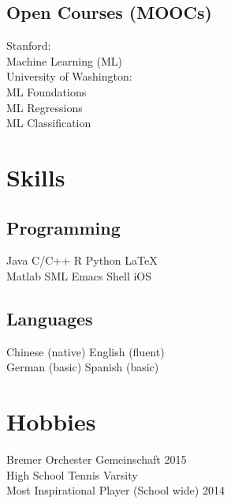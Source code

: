 \documentclass[]{deedy-resume-openfont}
\begin{document}
\begin{minipage}[t]{0.33\textwidth}
\sectionsep

\subsection{Open Courses (MOOCs)}
{\large Stanford}: \\
Machine Learning (ML) \\

\sectionsep
{\large University of Washington}:  \\
ML Foundations  \\
ML Regressions  \\
ML Classification

\sectionsep


\section{Skills}
\subsection{Programming}
Java \textbullet{}   C/C++ \textbullet{} R \textbullet{} Python \textbullet \LaTeX \\
Matlab \textbullet{} SML \textbullet{} Emacs \textbullet{} Shell \textbullet{} iOS \\

\sectionsep

\subsection{Languages}
Chinese (native) \textbullet{}  English (fluent) \\
German (basic) \textbullet{}   Spanish (basic)

\sectionsep

\section{Hobbies}
\textbullet{}  Bremer Orchester Gemeinschaft 2015 \\
\textbullet{} High School Tennis Varsity \\
\textbullet{} Most Inspirational Player (School wide) 2014 

%
%

\end{minipage} 
\end{document}
